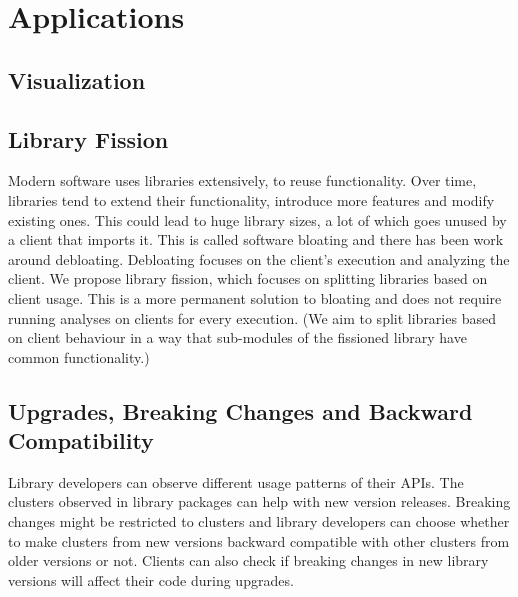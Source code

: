 \chapter{Applications}
\section{Visualization}

\section{Library Fission}
Modern software uses libraries extensively, to reuse functionality. Over time, libraries tend to extend their functionality, introduce more features and modify existing ones. This could lead to huge library sizes, a lot of which goes unused by a client that imports it. This is called software bloating and there has been work around debloating. Debloating focuses on the client’s execution and analyzing the client. We propose library fission, which focuses on splitting libraries based on client usage. This is a more permanent solution to bloating and does not require running analyses on clients for every execution. (We aim to split libraries based on client behaviour in a way that sub-modules of the fissioned library have common functionality.)

\section{Upgrades, Breaking Changes and Backward Compatibility}
Library developers can observe different usage patterns of their APIs. The clusters observed in library packages can help with new version releases. Breaking changes might be restricted to clusters and library developers can choose whether to make clusters from new versions backward compatible with other clusters from older versions or not. Clients can also check if breaking changes in new library versions will affect their code during upgrades. 